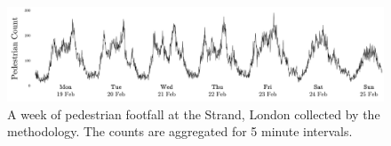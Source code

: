 \begin{figure}
	\begin{center}
		\includegraphics [width=\linewidth] {images/main_footfall.jpeg}
		\caption{A week of pedestrian footfall at the Strand, London collected by the methodology. The counts are aggregated for 5 minute intervals.}
		\label{main_study_counts}
	\end{center}
\end{figure}
